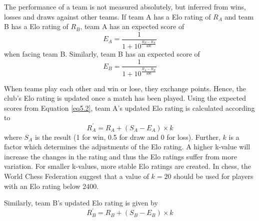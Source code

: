 \newpar

\begin{comment}
Elo ratings can be obtained according to Equation \ref{eq5.2} and \ref{eq5.4}. Clubelo.com provide historical Elo ratings for most of the professional football teams in the world, including teams in the English Premier League, English 1st division etc. These ratings are used in order to compute the relative team strength in this project, using a k-value of 20. A great advantage of the ratings provided by Clubelo is the fact that these values are modified, taking into account home field advantage, goal difference and inter-league adjustments. In addition, the Elo values from Clubelo incorporate all fixtures and not only league matches.
\end{comment}

The performance of a team is not measured absolutely, but inferred from wins, losses and draws against other teams. If team A has a Elo rating of $R_A$ and team B has a Elo rating of $R_B$, team A has an expected score of 
\begin{equation}\label{eq5.2}
    E_A = \frac{1}{1+10^{\frac{R_B - R_A}{400}}}
\end{equation}
when facing team B. Similarly, team B has an expected score of
\begin{equation}\label{eq5.3}
    E_B = \frac{1}{1+10^{\frac{R_A - R_B}{400}}}
\end{equation}

\newpar
When teams play each other and win or lose, they exchange points. Hence, the club's Elo rating is updated once a match has been played. Using the expected scores from Equation \ref{eq5.2}, team A's updated Elo rating is calculated according to
\begin{equation} \label{eq5.4}
    R^{'}_A = R_A + (S_A-E_A) \times k
\end{equation}
where $S_A$ is the result (1 for win, 0.5 for draw and 0 for loss). Further, $k$ is a factor which determines the adjustments of the Elo rating. A higher k-value will increase the changes in the rating and thus the Elo ratings suffer from more variation. For smaller k-values, more stable Elo ratings are created. In chess, the World Chess Federation suggest that a value of $k = 20$ should be used for players with an Elo rating below 2400. 

\newpar

Similarly, team B's updated Elo rating is given by
\begin{equation} \label{eq5.5}
    R^{'}_B = R_B + (S_B-E_B) \times k
\end{equation}

